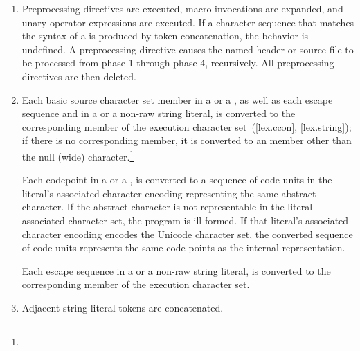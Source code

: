 \documentclass{wg21}
\begin{document}
\begin{enumerate}
    \item Preprocessing directives are executed, macro invocations are
    expanded, and  unary operator expressions are executed.
    If a character sequence that matches the syntax of a
     is produced by token
    concatenation, the behavior is undefined. A
     preprocessing directive causes the named header or
    source file to be processed from phase 1 through phase 4, recursively.
    All preprocessing directives are then deleted.

    \item 
    \begin{removedblock}Each basic source character set member in a  or a
    , as well as each escape sequence and  in a
     or a non-raw string literal, is converted to the corresponding
    member of the execution character set~(\ref{lex.ccon}, \ref{lex.string}); if
    there is no corresponding member, it is converted to an  member other
    than the null (wide) character.\footnote{}
    \end{removedblock}
    
    \begin{addedblock}
        Each codepoint in a  or a , is converted to a sequence of code units in the literal's associated character encoding representing the same abstract character. If the abstract character is not representable in the literal associated character set, the program is ill-formed.
        If that literal's associated character encoding encodes the Unicode character set, the converted sequence of code units represents the same code points as the internal representation.  
        
        Each escape sequence in a  or a non-raw string literal, is converted to the corresponding
        member of the execution character set.
    \end{addedblock}

    \item Adjacent string literal tokens are concatenated.


\end{enumerate}
\end{document}
